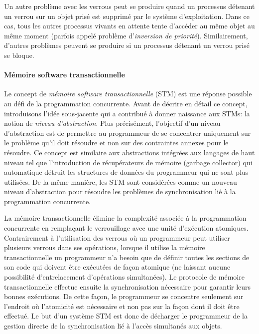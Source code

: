 Un autre problème avec les verrous peut se produire quand un processus détenant un verrou sur un objet prisé est supprimé
par le système d'exploitation. Dans ce cas, tous les autres processus vivants en attente tente d'accéder au même objet au même moment (parfois appelé problème d'\emph{inversion de priorité}). Similairement, d'autres problèmes peuvent se produire si un processus détenant un verrou prisé se bloque.


\paragraph{Mémoire software transactionnelle}
Le concept de \emph{mémoire software transactionnelle} (STM) est une réponse possible au défi de la programmation concurrente.
Avant de décrire en détail ce concept, introduisons l'idée sous-jacente qui a contribué à donner naissance aux STMs: la notion de \emph{niveau d'abstraction}.
Plus précisément, l'objectif d'un niveau d'abstraction est de permettre au programmeur de se concentrer uniquement sur le problème qu'il doit résoudre et non sur des contraintes annexes pour le résoudre.
Ce concept est similaire aux abstractions intégrées aux langages de haut niveau tel que l'introduction de récupérateurs de mémoire (garbage collector) qui automatique détruit les structures de données du programmeur qui ne sont plus utilisées.
De la même manière, les STM sont considérées comme un nouveau niveau d'abstraction pour résoudre les problèmes de synchronisation lié à la programmation concurrente.

La mémoire transactionnelle élimine la complexité associée à la programmation concurrente en remplaçant le verrouillage avec une unité d'exécution atomiques.
Contrairement à l'utilisation des verrous où un programmeur peut utiliser plusieurs verrous dans ses opérations, lorsque il utilise la mémoire transactionnelle un programmeur n'a besoin que
de définir toutes les sections de son code qui doivent être exécutées de façon atomique (ne laissant aucune possibilité d'entrelacement d'opérations simultanées).
Le protocole de mémoire transactionnelle effectue ensuite la synchronisation nécessaire pour garantir leurs bonnes exécutions.
De cette façon, le programmeur se concentre seulement sur l'endroit où l'atomicité est nécessaire et non pas sur la façon dont il doit être effectué.
Le but d'un système STM est donc de décharger le programmeur de la gestion directe de la synchronisation lié à l'accès simultanés aux objets.


